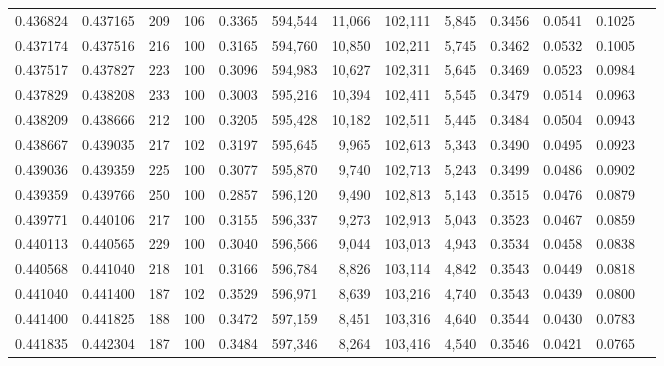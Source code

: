 \begin{tabular}{rrrrrrrrrrrrr}
0.436824 & 0.437165 &   209 & 106 &                                     0.3365 & 594,544 &  11,066 & 102,111 &   5,845 & 0.3456 & 0.0541 & 0.1025 \\
0.437174 & 0.437516 &   216 & 100 &                                     0.3165 & 594,760 &  10,850 & 102,211 &   5,745 & 0.3462 & 0.0532 & 0.1005 \\
0.437517 & 0.437827 &   223 & 100 &                                     0.3096 & 594,983 &  10,627 & 102,311 &   5,645 & 0.3469 & 0.0523 & 0.0984 \\
0.437829 & 0.438208 &   233 & 100 &                                     0.3003 & 595,216 &  10,394 & 102,411 &   5,545 & 0.3479 & 0.0514 & 0.0963 \\
0.438209 & 0.438666 &   212 & 100 &                                     0.3205 & 595,428 &  10,182 & 102,511 &   5,445 & 0.3484 & 0.0504 & 0.0943 \\
0.438667 & 0.439035 &   217 & 102 &                                     0.3197 & 595,645 &   9,965 & 102,613 &   5,343 & 0.3490 & 0.0495 & 0.0923 \\
0.439036 & 0.439359 &   225 & 100 &                                     0.3077 & 595,870 &   9,740 & 102,713 &   5,243 & 0.3499 & 0.0486 & 0.0902 \\
0.439359 & 0.439766 &   250 & 100 &                                     0.2857 & 596,120 &   9,490 & 102,813 &   5,143 & 0.3515 & 0.0476 & 0.0879 \\
0.439771 & 0.440106 &   217 & 100 &                                     0.3155 & 596,337 &   9,273 & 102,913 &   5,043 & 0.3523 & 0.0467 & 0.0859 \\
0.440113 & 0.440565 &   229 & 100 &                                     0.3040 & 596,566 &   9,044 & 103,013 &   4,943 & 0.3534 & 0.0458 & 0.0838 \\
0.440568 & 0.441040 &   218 & 101 &                                     0.3166 & 596,784 &   8,826 & 103,114 &   4,842 & 0.3543 & 0.0449 & 0.0818 \\
0.441040 & 0.441400 &   187 & 102 &                                     0.3529 & 596,971 &   8,639 & 103,216 &   4,740 & 0.3543 & 0.0439 & 0.0800 \\
0.441400 & 0.441825 &   188 & 100 &                                     0.3472 & 597,159 &   8,451 & 103,316 &   4,640 & 0.3544 & 0.0430 & 0.0783 \\
0.441835 & 0.442304 &   187 & 100 &                                     0.3484 & 597,346 &   8,264 & 103,416 &   4,540 & 0.3546 & 0.0421 & 0.0765 \\

\end{tabular}

